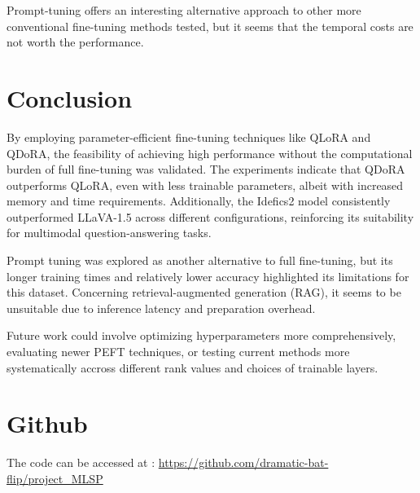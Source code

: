 \documentclass{article}
\begin{document}
Prompt-tuning offers an interesting alternative approach to other more conventional fine-tuning methods tested, but it seems
that the temporal costs are not worth the performance.



\section{Conclusion}
\label{sec:conclusion}

By employing parameter-efficient fine-tuning techniques like QLoRA and QDoRA, the feasibility of achieving high performance without the computational burden of full fine-tuning was validated. The experiments indicate that QDoRA outperforms QLoRA, even with less trainable parameters, albeit with increased memory and time requirements. Additionally, the Idefics2 model consistently outperformed LLaVA-1.5 across different configurations, reinforcing its suitability for multimodal question-answering tasks.

Prompt tuning was explored as another alternative to full fine-tuning, but its longer training times and relatively lower accuracy highlighted its limitations for this dataset. Concerning retrieval-augmented generation (RAG), it seems to be unsuitable due to inference latency and preparation overhead.

Future work could involve optimizing hyperparameters more comprehensively, evaluating newer PEFT techniques, or testing current methods more systematically accross different rank values and
choices of trainable layers.



\vfill\pagebreak





\section{Github}

The code can be accessed at : \url{https://github.com/dramatic-bat-flip/project_MLSP}
\end{document}
